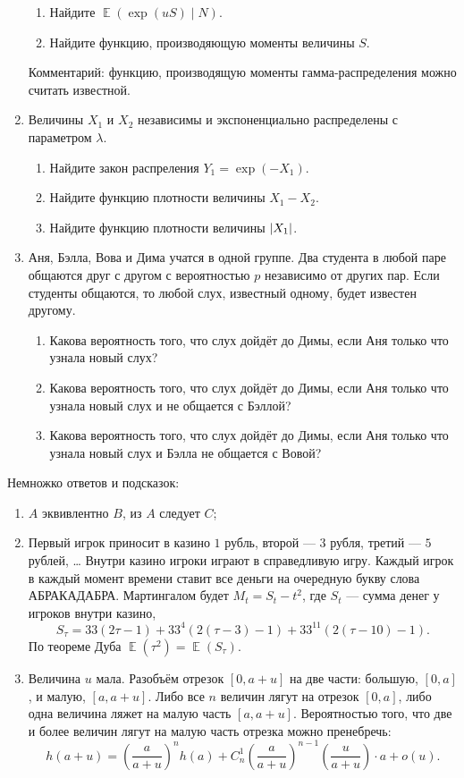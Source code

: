 \documentclass[12pt]{article}
\DeclarePairedDelimiter{\abs}{\lvert}{\rvert}
\DeclareMathOperator{\E}{\mathbb{E}}
\begin{document}
\begin{enumerate}
\begin{enumerate}
    \item Найдите $\E(\exp(u S) \mid N)$.
    \item Найдите функцию, производяющую моменты величины $S$.
\end{enumerate}

Комментарий: функцию, производящую моменты гамма-распределения можно считать известной.

\item Величины $X_1$ и $X_2$ независимы и экспоненциально распределены с параметром $\lambda$. 
\begin{enumerate}
    \item Найдите закон распреления $Y_1 = \exp(-X_1)$.
    \item Найдите функцию плотности величины $X_1 - X_2$.
    \item Найдите функцию плотности величины $\abs{X_1}$.
\end{enumerate}


\item Аня, Бэлла, Вова и Дима учатся в одной группе. 
Два студента в любой паре общаются друг с другом с вероятностью $p$ независимо от других пар.
Если студенты общаются, то любой слух, известный одному, будет известен другому. 
\begin{enumerate}
    \item Какова вероятность того, что слух дойдёт до Димы, если Аня только что узнала новый слух?
    \item Какова вероятность того, что слух дойдёт до Димы, если Аня только что узнала новый слух и не общается с Бэллой?
    \item Какова вероятность того, что слух дойдёт до Димы, если Аня только что узнала новый слух и Бэлла не общается с Вовой?
\end{enumerate}

\end{enumerate}


Немножко ответов и подсказок:

\begin{enumerate}
    \item $A$ эквивлентно $B$, из $A$ следует $C$;
    \item Первый игрок приносит в казино $1$ рубль, второй — $3$ рубля, третий — $5$ рублей, \dots
    Внутри казино игроки играют в справедливую игру. 
    Каждый игрок в каждый момент времени ставит все деньги на очередную букву слова АБРАКАДАБРА.
    Мартингалом будет $M_t = S_t - t^2$, где $S_t$ — сумма денег у игроков внутри казино,
    \[
    S_{\tau} = 33(2\tau - 1) + 33^4(2(\tau - 3) - 1) + 33^{11}(2(\tau - 10) - 1).
    \]
    По теореме Дуба $\E(\tau^2) = \E(S_\tau)$.
    \item Величина $u$ мала. Разобъём отрезок $[0, a + u]$ на две части: большую, $[0, a]$, и малую, $[a, a + u]$.
    Либо все $n$ величин лягут на отрезок $[0, a]$, либо одна величина ляжет на малую часть $[a, a + u]$.
    Вероятностью того, что две и более величин лягут на малую часть отрезка можно пренебречь:
    \[
    h(a + u) = \left(\frac{a}{a + u}\right)^n h(a) + C_n^1 \left(\frac{a}{a + u}\right)^{n-1} \left(\frac{u}{a + u}\right) \cdot a + o(u).
    \]
\end{enumerate}
\end{document}
